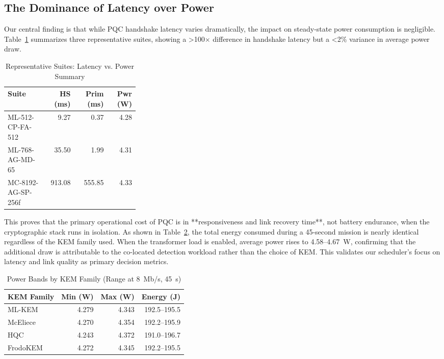 \documentclass[sigconf,natbib=false]{acmart}
\begin{document}
\subsection{The Dominance of Latency over Power}

Our central finding is that while PQC handshake latency varies dramatically, the impact on steady-state power consumption is negligible. Table~\ref{tab:rep_suites} summarizes three representative suites, showing a >100$\times$ difference in handshake latency but a <2\% variance in average power draw.

\begin{table}[ht]
\centering
\caption{Representative Suites: Latency vs. Power Summary}
\label{tab:rep_suites}
\begingroup
\small
\setlength{\tabcolsep}{3pt}
\begin{tabular}{@{}p{0.30\linewidth}rrr@{}}
\toprule
\textbf{Suite} & \textbf{HS (ms)} & \textbf{Prim (ms)} & \textbf{Pwr (W)} \\
\midrule
ML-512-CP-FA-512 & 9.27 & 0.37 & 4.28 \\
ML-768-AG-MD-65 & 35.50 & 1.99 & 4.31 \\
MC-8192-AG-SP-256f & 913.08 & 555.85 & 4.33 \\
\bottomrule
\end{tabular}
\endgroup
\end{table}

This proves that the primary operational cost of PQC is in **responsiveness and link recovery time**, not battery endurance, when the cryptographic stack runs in isolation. As shown in Table~\ref{tab:powerbands}, the total energy consumed during a 45-second mission is nearly identical regardless of the KEM family used. When the transformer load is enabled, average power rises to 4.58--4.67~W, confirming that the additional draw is attributable to the co-located detection workload rather than the choice of KEM. This validates our scheduler's focus on latency and link quality as primary decision metrics.

\begin{table}[ht]
\centering
\caption{Power Bands by KEM Family (Range at 8~Mb/s, 45~s)}
\label{tab:powerbands}
\begingroup
\small
\setlength{\tabcolsep}{4pt}
\begin{tabular}{@{}lrrr@{}}
\toprule
\textbf{KEM Family} & \textbf{Min (W)} & \textbf{Max (W)} & \textbf{Energy (J)} \\
\midrule
ML-KEM & 4.279 & 4.343 & 192.5--195.5 \\
McEliece & 4.270 & 4.354 & 192.2--195.9 \\
HQC & 4.243 & 4.372 & 191.0--196.7 \\
FrodoKEM & 4.272 & 4.345 & 192.2--195.5 \\
\bottomrule
\end{tabular}
\endgroup
\end{table}
\end{document}
